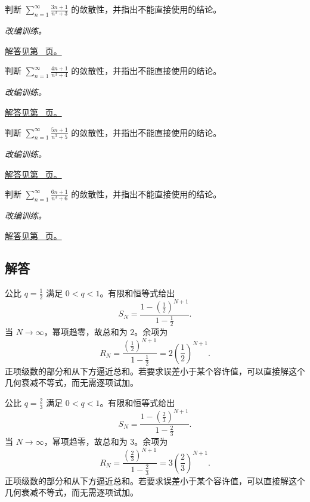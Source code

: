 \documentclass[12pt,fontset=fandol]{ctexart}
\begin{document}
\begin{example}[极限比较与主导次数]\label{ex:c24q21}
判断 $\displaystyle\sum_{n=1}^\infty\frac{3n+1}{n^3+3}$ 的敛散性，并指出不能直接使用的结论。
\par\textit{改编训练。}\par\hyperref[ans:c24q21]{解答见第~\pageref{ans:c24q21} 页。}
\end{example}
\begin{example}[极限比较与主导次数]\label{ex:c24q22}
判断 $\displaystyle\sum_{n=1}^\infty\frac{4n+1}{n^3+4}$ 的敛散性，并指出不能直接使用的结论。
\par\textit{改编训练。}\par\hyperref[ans:c24q22]{解答见第~\pageref{ans:c24q22} 页。}
\end{example}
\begin{example}[极限比较与主导次数]\label{ex:c24q23}
判断 $\displaystyle\sum_{n=1}^\infty\frac{5n+1}{n^3+5}$ 的敛散性，并指出不能直接使用的结论。
\par\textit{改编训练。}\par\hyperref[ans:c24q23]{解答见第~\pageref{ans:c24q23} 页。}
\end{example}
\begin{example}[极限比较与主导次数]\label{ex:c24q24}
判断 $\displaystyle\sum_{n=1}^\infty\frac{6n+1}{n^3+6}$ 的敛散性，并指出不能直接使用的结论。
\par\textit{改编训练。}\par\hyperref[ans:c24q24]{解答见第~\pageref{ans:c24q24} 页。}
\end{example}
\subsection{解答}
\begin{solve}\label{ans:c24q1}
公比 $q=\frac{1}{2}$ 满足 $0<q<1$。有限和恒等式给出
\[
S_N=\frac{1-(\frac{1}{2})^{N+1}}{1-\frac{1}{2}}.
\]
当 $N\to\infty$，幂项趋零，故总和为 $2$。余项为
\[
R_N=\frac{(\frac{1}{2})^{N+1}}{1-\frac{1}{2}}=2(\frac{1}{2})^{N+1}.
\]
正项级数的部分和从下方逼近总和。若要求误差小于某个容许值，可以直接解这个几何衰减不等式，而无需逐项试加。
\end{solve}

\begin{solve}\label{ans:c24q2}
公比 $q=\frac{2}{3}$ 满足 $0<q<1$。有限和恒等式给出
\[
S_N=\frac{1-(\frac{2}{3})^{N+1}}{1-\frac{2}{3}}.
\]
当 $N\to\infty$，幂项趋零，故总和为 $3$。余项为
\[
R_N=\frac{(\frac{2}{3})^{N+1}}{1-\frac{2}{3}}=3(\frac{2}{3})^{N+1}.
\]
正项级数的部分和从下方逼近总和。若要求误差小于某个容许值，可以直接解这个几何衰减不等式，而无需逐项试加。
\end{solve}
\end{document}

